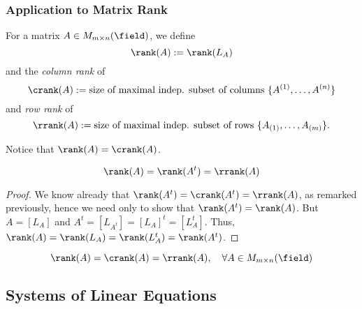 \subsubsection{Application to Matrix Rank}

\begin{definition}
    For a matrix $A \in M_{m\times n} (\field)$, we define \[
    \rank(A) := \rank(L_A)    
    \]
    and the \emph{column rank} of \[
    \crank(A) := \text{size of maximal indep. subset of columns } \{A^{(1)}, \dots, A^{(n)}\}
    \]
    and \emph{row rank} of \[
    \rrank(A) := \text{size of maximal indep. subset of rows } \{A_{(1)}, \dots, A_{(m)}\}.
    \]
\end{definition}

\begin{remark}
    Notice that $\rank(A) = \crank(A)$.
\end{remark}

\begin{corollary}
    \[
    \rank(A) = \rank(A^t) = \rrank(A)
    \]
\end{corollary}

\begin{proof}
    We know already that $\rank(A^t) = \crank(A^t) = \rrank(A)$, as remarked previously, hence we need only to show that $\rank(A^t) = \rank(A)$. But $A = [L_A]$ and $A^t = [L_{A^t}] = [L_A]^t = [L_A^t]$. Thus, $\rank(A) = \rank(L_A) = \rank(L_A^t) = \rank(A^t)$.
\end{proof}

\begin{corollary}
    $$\rank(A) = \crank(A) = \rrank(A), \quad \forall A \in M_{m \times n}(\field)$$
\end{corollary}

\subsection{Systems of Linear Equations}

